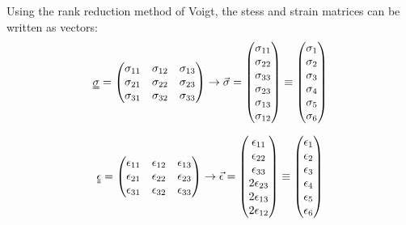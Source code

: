 Using the rank reduction method of Voigt, the stess and strain matrices can be written as vectors:
\begin{equation}
	\uuline{\sigma} = 
	\begin{pmatrix}
	\sigma_{11} & \sigma_{12} & \sigma_{13} \\
	\sigma_{21} & \sigma_{22} & \sigma_{23} \\
	\sigma_{31} & \sigma_{32} & \sigma_{33} \\ 
	\end{pmatrix}
	\to 
	\vec{\sigma} = 
	\begin{pmatrix}
	\sigma_{11} \\ \sigma_{22} \\ \sigma_{33} \\ \sigma_{23} \\ \sigma_{13} \\ \sigma_{12}
	\end{pmatrix}
	\equiv
	\begin{pmatrix}
	\sigma_{1} \\ \sigma_{2} \\ \sigma_{3} \\ \sigma_{4} \\ \sigma_{5} \\ \sigma_{6}
	\end{pmatrix}
\end{equation}

\begin{equation}
	\uuline{\epsilon} = 
	\begin{pmatrix}
	\epsilon_{11} & \epsilon_{12} & \epsilon_{13} \\
	\epsilon_{21} & \epsilon_{22} & \epsilon_{23} \\
	\epsilon_{31} & \epsilon_{32} & \epsilon_{33} \\ 
	\end{pmatrix}
	\to 
	\vec{\epsilon} = 
	\begin{pmatrix}
	\epsilon_{11} \\ \epsilon_{22} \\ \epsilon_{33} \\ 2\epsilon_{23} \\ 2\epsilon_{13} \\ 2\epsilon_{12}
	\end{pmatrix}
	\equiv
	\begin{pmatrix}
	\epsilon_{1} \\ \epsilon_{2} \\ \epsilon_{3} \\ \epsilon_{4} \\ \epsilon_{5} \\ \epsilon_{6}
	\end{pmatrix}
\end{equation}

